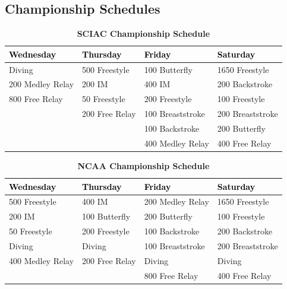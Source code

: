 
\subsection*{Championship Schedules}

\begin{table}[H]
\centering
\caption*{\textbf{\textcolor{teamprimary}{SCIAC Championship Schedule}}}
\renewcommand{\arraystretch}{1.3}
\begin{tabular}{p{3.5cm} p{3.5cm} p{3.5cm} p{3.5cm}}
\toprule
\rowcolor{teamprimary!25}
\textbf{\textcolor{black}{Wednesday}} & \textbf{\textcolor{black}{Thursday}} & \textbf{\textcolor{black}{Friday}} & \textbf{\textcolor{black}{Saturday}} \\
\midrule
\rowcolor{teamsecondary!12}
Diving & 500 Freestyle & 100 Butterfly & 1650 Freestyle \\
\rowcolor{teamprimary!8}
200 Medley Relay & 200 IM & 400 IM & 200 Backstroke \\
\rowcolor{teamsecondary!12}
800 Free Relay & 50 Freestyle & 200 Freestyle & 100 Freestyle \\
\rowcolor{teamprimary!8}
 & 200 Free Relay & 100 Breaststroke & 200 Breaststroke \\
\rowcolor{teamsecondary!12}
 &  & 100 Backstroke & 200 Butterfly \\
\rowcolor{teamprimary!8}
 &  & 400 Medley Relay & 400 Free Relay \\
\bottomrule
\end{tabular}
\end{table}

\begin{table}[H]
\centering
\caption*{\textbf{\textcolor{teamprimary}{NCAA Championship Schedule}}}
\renewcommand{\arraystretch}{1.3}
\begin{tabular}{p{3.5cm} p{3.5cm} p{3.5cm} p{3.5cm}}
\toprule
\rowcolor{teamprimary!25}
\textbf{\textcolor{black}{Wednesday}} & \textbf{\textcolor{black}{Thursday}} & \textbf{\textcolor{black}{Friday}} & \textbf{\textcolor{black}{Saturday}} \\
\midrule
\rowcolor{teamsecondary!12}
500 Freestyle & 400 IM & 200 Medley Relay & 1650 Freestyle \\
\rowcolor{teamprimary!8}
200 IM & 100 Butterfly & 200 Butterfly & 100 Freestyle \\
\rowcolor{teamsecondary!12}
50 Freestyle & 200 Freestyle & 100 Backstroke & 200 Backstroke \\
\rowcolor{teamprimary!8}
Diving & Diving & 100 Breaststroke & 200 Breaststroke \\
\rowcolor{teamsecondary!12}
400 Medley Relay & 200 Free Relay & Diving & Diving \\
\rowcolor{teamprimary!8}
 &  & 800 Free Relay & 400 Free Relay \\
\bottomrule
\end{tabular}
\end{table}



